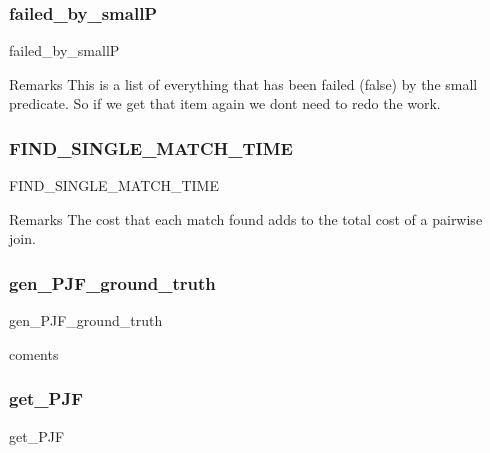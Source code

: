 \subsubsection{\texorpdfstring{failed\_by\_smallP}{failed\_by\_smallP}}
{\footnotesize\ttfamily failed\+\_\+by\+\_\+smallP}

\begin{DoxyRemark}{Remarks}
This is a list of everything that has been failed (false) by the small predicate. So if we get that item again we don\textquotesingle{}t need to redo the work. 
\end{DoxyRemark}
\mbox{\label{classdynamicfilterapp_1_1models_1_1_join_a82c364d7ac06cd8c42ccf394d0c610ef}} 
\subsubsection{\texorpdfstring{FIND\_SINGLE\_MATCH\_TIME}{FIND\_SINGLE\_MATCH\_TIME}}
{\footnotesize\ttfamily F\+I\+N\+D\+\_\+\+S\+I\+N\+G\+L\+E\+\_\+\+M\+A\+T\+C\+H\+\_\+\+T\+I\+ME}

\begin{DoxyRemark}{Remarks}
The cost that each match found adds to the total cost of a pairwise join. 
\end{DoxyRemark}
\mbox{\label{classdynamicfilterapp_1_1models_1_1_join_abbd60e6de881162d4729a417f6083f0c}} 
\subsubsection{\texorpdfstring{gen\_PJF\_ground\_truth}{gen\_PJF\_ground\_truth}}
{\footnotesize\ttfamily gen\+\_\+\+P\+J\+F\+\_\+ground\+\_\+truth}



coments 

\mbox{\label{classdynamicfilterapp_1_1models_1_1_join_a30fc551c8a3a3bd30563a9464754246b}} 
\subsubsection{\texorpdfstring{get\_PJF}{get\_PJF}}
{\footnotesize\ttfamily get\+\_\+\+P\+JF}

